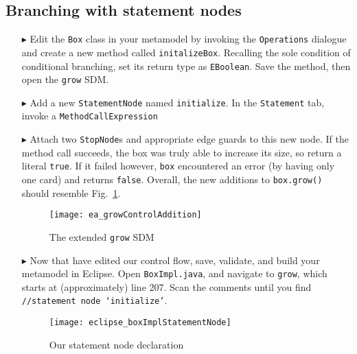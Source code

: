 \clearpage
\hypertarget{conBran vis}{}
\subsection{Branching with statement nodes}
\visHeader

\begin{itemize}
  
\item[$\blacktriangleright$] Edit the \texttt{Box} class in your metamodel by invoking the \texttt{Operations} dialogue and create a new method called
\texttt{initalizeBox}. Recalling the sole condition of conditional branching, set its return type as \texttt{EBoolean}. Save the method, then open the \texttt{grow} SDM.

\item[$\blacktriangleright$] Add a new \texttt{StatementNode} named \texttt{initialize}. In the \texttt{Statement} tab, invoke a \texttt{MethodCallExpression}

\item[$\blacktriangleright$] Attach two \texttt{StopNode}s and appropriate edge guards to this new node. If the method call succeeds, the box was truly able
to increase its size, so return a literal \texttt{true}. If it failed however, \texttt{box} encountered an error (by having only one card) and returns
\texttt{false}. Overall, the new additions to \texttt{box.grow()} should resemble Fig.~\ref{fig:newGrowControl}.

\begin{figure}[htp]
\begin{center}
  \texttt{[image: ea\_growControlAddition]}
  \caption{The extended \texttt{grow} SDM}
  \label{fig:newGrowControl}
\end{center}
\end{figure}

\item[$\blacktriangleright$] Now that have edited our control flow, save, validate, and build your metamodel in Eclipse. Open \texttt{BoxImpl.java},
and navigate to \texttt{grow}, which starts at (approximately) line 207. Scan the comments until you find \texttt{//statement node `initialize'}.

\begin{figure}[htp]
\begin{center}
  \texttt{[image: eclipse\_boxImplStatementNode]}
  \caption{Our statement node declaration}
  \label{fig:initBoxImpl}
\end{center}
\end{figure}


\end{itemize}
